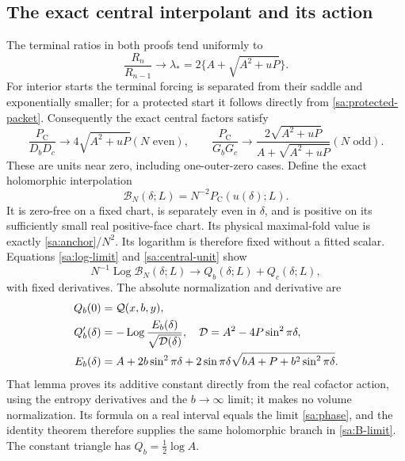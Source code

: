 \documentclass[11pt]{article}
\numberwithin{equation}{section}
\theoremstyle{definition}\newtheorem{definition}[theorem]{Definition}
\theoremstyle{remark}\newtheorem{remark}[theorem]{Remark}
\newcommand{\Loga}{\operatorname{Log}}
\newcommand{\calQ}{\mathcal Q}
\begin{document}
\subsection{The exact central interpolant and its action}
The terminal ratios in both proofs tend uniformly to
\[
 \frac{R_n}{R_{n-1}}\longrightarrow
       \lambda_*=2\{A+\sqrt{A^2+uP}\}.
\]
For interior starts the terminal forcing is separated from their
saddle and exponentially smaller; for a protected start it follows
directly from \eqref{sa:protected-packet}.
Consequently the exact central factors satisfy
\begin{equation}\label{sa:central-unit}
 \frac{P_{\mathrm C}}{D_bD_c}\longrightarrow4\sqrt{A^2+uP} (N\text{ even}),
 \qquad
 \frac{P_{\mathrm C}}{G_bG_c}\longrightarrow
           \frac{2\sqrt{A^2+uP}}{A+\sqrt{A^2+uP}} (N\text{ odd}).
\end{equation}
These are units near zero, including one-outer-zero cases.
Define the exact holomorphic interpolation
\begin{equation}\label{sa:exact-B}
 \mathcal B_N(\delta;L)=N^{-2}P_{\mathrm C}(u(\delta);L).
\end{equation}
It is zero-free on a fixed chart, is separately even in $\delta$,
and is positive on its sufficiently small real positive-face chart.
Its physical maximal-fold value is exactly \eqref{sa:anchor}/$N^2$.
Its logarithm is therefore fixed without a fitted scalar. Equations
\eqref{sa:log-limit} and \eqref{sa:central-unit} show
\begin{equation}\label{sa:B-limit}
 N^{-1}\Loga\mathcal B_N(\delta;L)
                \longrightarrow Q_b(\delta;L)+Q_c(\delta;L),
\end{equation}
with fixed derivatives. The absolute normalization and derivative are
\cite[Lemma 5.1]{Local}
\begin{align}
 Q_b(0)&=\calQ(x,b,y),\notag\\
 Q_b'(\delta)&=-\Loga\frac{E_b(\delta)}{\sqrt{\mathcal D(\delta)}},
 \quad\mathcal D=A^2-4P\sin^2\pi\delta,\label{sa:Q-derivative}\\
 E_b(\delta)&=A+2b\sin^2\pi\delta
       +2\sin\pi\delta\sqrt{bA+P+b^2\sin^2\pi\delta}.\notag
\end{align}
That lemma proves its additive constant directly from the real
cofactor action, using the entropy derivatives and the $b\to\infty$
limit; it makes no volume normalization. Its formula on a real
interval equals the limit \eqref{sa:phase}, and the identity theorem
therefore supplies the same holomorphic branch in \eqref{sa:B-limit}.
The constant triangle has $Q_b=\tfrac12\log A$.
\end{document}
